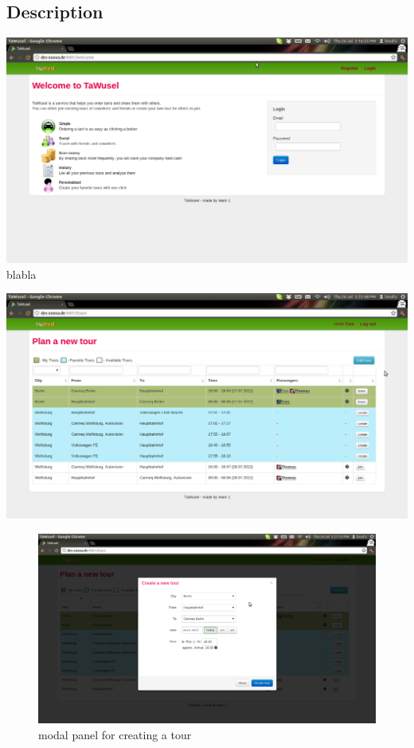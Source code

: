 \subsection{Description}\label{ssec:WedDesc}

\includegraphics[width=16cm]{images/TaWusel_Web_Login.png}\label{img:WebLogin}
blabla


\includegraphics[width=16cm]{images/TaWusel_Web_main.png}\label{img:WebLogin}



\begin{figure}[h]
	\includegraphics[width=16cm]{images/TaWusel_Web_create.png}
	\caption{modal panel for creating a tour}
	\label{img:WebLogin}
\end{figure}



